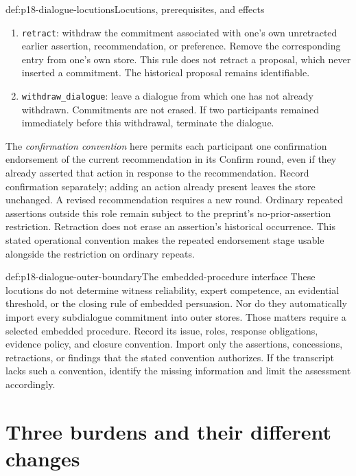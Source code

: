 \begin{hbmethod}{def:p18-dialogue-locutions}{Locutions, prerequisites, and effects}
\begin{enumerate}
if present. Do not edit the recommender's store. Rejection does not
assert a negative factual proposition.
\item \texttt{retract}: withdraw the commitment associated with one's
own unretracted earlier assertion, recommendation, or preference.
Remove the corresponding entry from one's own store. This rule does
not retract a proposal, which never inserted a commitment.
The historical proposal remains identifiable.
\item \texttt{withdraw\_dialogue}: leave a dialogue from which one has
not already withdrawn. Commitments are not erased. If two participants
remained immediately before this withdrawal, terminate the dialogue.
\end{enumerate}
\end{hbmethod}

The \emph{confirmation convention} here permits each participant one
confirmation endorsement of the current recommendation in its Confirm
round, even if they already asserted that action in response to the
recommendation. Record confirmation separately; adding an action already
present leaves the store unchanged. A revised recommendation requires
a new round. Ordinary repeated assertions outside this role remain
subject to the preprint's no-prior-assertion restriction. Retraction
does not erase an assertion's historical occurrence.
This stated operational convention makes the repeated endorsement
stage usable alongside the restriction on ordinary repeats.

\begin{proofboundary}{def:p18-dialogue-outer-boundary}{The embedded-procedure interface}
These locutions do not determine witness reliability, expert competence,
an evidential threshold, or the closing rule of embedded persuasion.
Nor do they automatically import every subdialogue commitment into
outer stores. Those matters require a selected embedded procedure.
Record its issue, roles, response obligations, evidence policy, and
closure convention. Import only the assertions, concessions, retractions,
or findings that the stated convention authorizes.
If the transcript lacks such a convention, identify the missing
information and limit the assessment accordingly.
\end{proofboundary}

\section{Three burdens and their different changes}
\label{sec:p18-dialogue-three-burdens}


